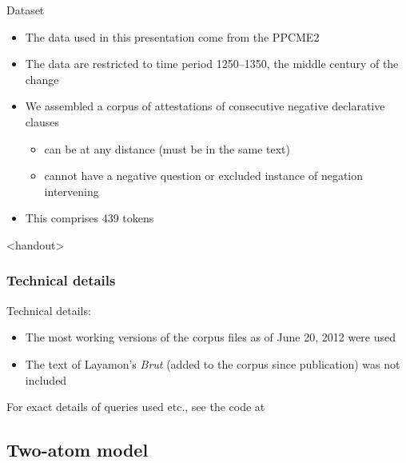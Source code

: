 \documentclass{digs-slides}
\begin{document}
\begin{frame}{Dataset}
    \begin{itemize}
      \item The data used in this presentation come from the
        PPCME2 \parencite{Kroch2001}
      \item The data are restricted to time period 1250–1350, the middle
        century of the change
      \item We assembled a corpus of attestations of consecutive
        negative declarative clauses
        \begin{itemize}
          \item can be at any distance (must be in the same text)
          \item cannot have a negative question or excluded instance of
            negation intervening
        \end{itemize}
      \item This comprises 439 tokens
    \end{itemize}
\end{frame}

\begin{frame}<handout>
    \frametitle{Technical details}
    Technical details:
    \begin{itemize}
      \item The most working versions of the corpus files as of June 20,
        2012 were used
      \item The text of Layamon’s \emph{Brut} (added to the corpus since
        publication) was not included
    \end{itemize}

    For exact details of queries used etc., see the code at %
\end{frame}

\subsection{Two-atom model}
\end{document}
